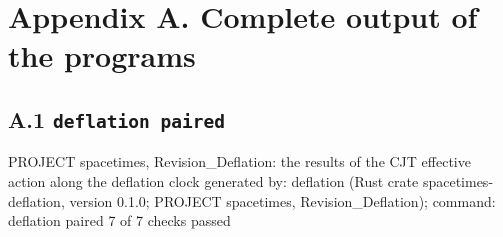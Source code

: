 \documentclass[
  10pt,
]{article}
\newenvironment{Shaded}{}{}
\newcommand{\NormalTok}[1]{#1}
\begin{document}
\hypertarget{appendix-a.-complete-output-of-the-programs}{%
\section{Appendix A. Complete output of the
programs}\label{appendix-a.-complete-output-of-the-programs}}

\hypertarget{a.1-deflation-paired}{%
\subsection{\texorpdfstring{A.1
\texttt{deflation\ paired}}{A.1 deflation paired}}\label{a.1-deflation-paired}}

\begin{Shaded}
\begin{Highlighting}[]
\NormalTok{PROJECT spacetimes, Revision\_Deflation: the results of the CJT effective action along the deflation clock}
\NormalTok{generated by: deflation (Rust crate spacetimes{-}deflation, version 0.1.0; PROJECT spacetimes, Revision\_Deflation); command: deflation paired}
\NormalTok{7 of 7 checks passed}


\end{Highlighting}
\end{Shaded}
\end{document}
